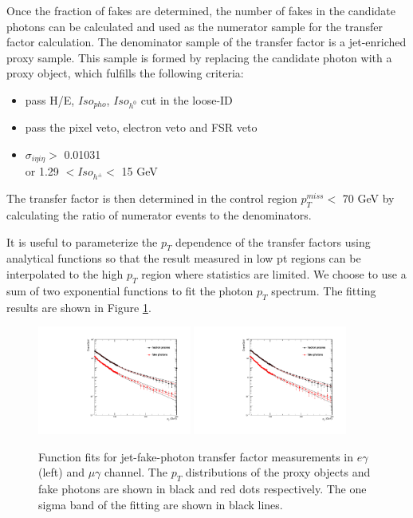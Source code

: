 \documentclass[thesis.tex]{subfiles}
\renewcommand\_{\textunderscore\allowbreak}
\begin{document}
Once the fraction of fakes are determined, the number of fakes in the candidate photons can be calculated and used as the numerator sample for the transfer factor calculation. The denominator sample of the transfer factor is a jet-enriched proxy sample. This sample is formed by replacing the candidate photon with a proxy object, which fulfills the following  criteria:
\begin{center}
\begin{itemize}
\item pass H/E, $Iso_{pho}$, $Iso_{h^0}$ cut in the loose-ID
\item pass the pixel veto, electron veto and FSR veto
\item $\sigma_{i\eta i\eta} >$ 0.01031 \\
     or   1.29 $< Iso_{h^\pm} <$ 15 GeV
\end{itemize}
\end{center}

The transfer factor is then determined in the control region $p_{T}^{miss} <$ 70 GeV by calculating the ratio of numerator events to the denominators.

It is useful to parameterize the $p_T$ dependence of the transfer factors using analytical functions so that the result measured in low pt regions can be interpolated to the high $p_T$ region where statistics are limited. We choose to use a sum of two exponential functions to fit the photon $p_T$ spectrum. The fitting results are shown in Figure \ref{fig:jetFakePt}.

\begin{figure}[hbtp]
  \centering
    \includegraphics[width=0.45\textwidth]{Figures/JetFakeRate_transfer_eg_EB.pdf}
    \includegraphics[width=0.45\textwidth]{Figures/JetFakeRate_transfer_mg_EB.pdf}
  \caption{Function fits for jet-fake-photon transfer factor measurements in $e\gamma$ (left) and $\mu\gamma$ channel. The $p_T$ distributions of the proxy objects and fake photons are shown in black and red dots respectively. The one sigma band of the fitting are shown in black lines.}
    \label{fig:jetFakePt}
\end{figure}
\end{document}
